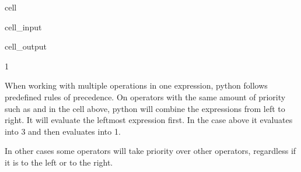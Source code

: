 \documentclass[letterpaper,10pt,english]{jupyterBook}
\begin{document}
\begin{sphinxuseclass}{cell}\begin{sphinxVerbatimInput}

\begin{sphinxuseclass}{cell_input}
\begin{sphinxVerbatim}[commandchars=\\\{\}]
    
\end{sphinxVerbatim}

\end{sphinxuseclass}\end{sphinxVerbatimInput}
\begin{sphinxVerbatimOutput}

\begin{sphinxuseclass}{cell_output}
\begin{sphinxVerbatim}[commandchars=\\\{\}]
\PYGZhy{}1
\end{sphinxVerbatim}

\end{sphinxuseclass}\end{sphinxVerbatimOutput}

\end{sphinxuseclass}
\sphinxAtStartPar
When working with multiple operations in one expression, python follows predefined rules of precedence. On operators with the same amount of priority such as \sphinxcode{\sphinxupquote{+}} and \sphinxcode{\sphinxupquote{\sphinxhyphen{}}} in the cell above, python will combine the expressions from left to right. It will evaluate the leftmost expression first. In the case above it evaluates  into 3 and then evaluates  into \sphinxhyphen{}1.

\sphinxAtStartPar
In other cases some operators will take priority over other operators, regardless if it is to the left or to the right.
\end{document}

